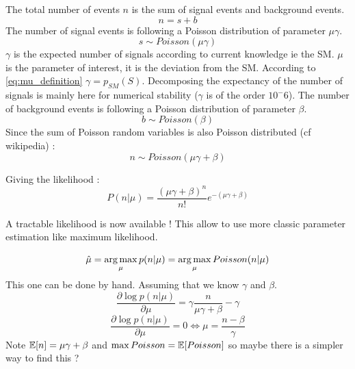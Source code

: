 

The total number of events $n$ is the sum of signal events and background events.
\begin{equation}
	n = s + b
\end{equation}
The number of signal events is following a Poisson distribution of parameter $\mu \gamma$.
\begin{equation}
	s \sim Poisson(\mu \gamma)
\end{equation}
$\gamma$ is the expected number of signals according to current knowledge ie the SM.
$\mu$ is the parameter of interest, it is the deviation from the SM.
According to \autoref{eq:mu_definition} $\gamma = p_{SM}(S)$.
Decomposing the expectancy of the number of signals is mainly here for numerical stability ($\gamma$ is of the order $10^-6$\needcite).
The number of background events is following a Poisson distribution of parameter $\beta$.
\begin{equation}
	b \sim Poisson(\beta)
\end{equation}
Since the sum of Poisson random variables is also Poisson distributed \needcite (cf wikipedia) :
\begin{equation}
	n \sim Poisson(\mu \gamma + \beta)
\end{equation}

Giving the likelihood :
\begin{equation}
	P(n| \mu) = \frac{(\mu \gamma +\beta)^n }{n!} e^{-(\mu \gamma +\beta)}
\end{equation}

A tractable likelihood is now available !
This allow to use more classic parameter estimation like maximum likelihood.

\begin{equation}
    \hat \mu = \operatorname*{arg\,max}_\mu p(n|\mu) =  \operatorname*{arg\,max}_\mu Poisson(n|\mu)
\end{equation}
This one can be done by hand. Assuming that we know $\gamma$ and  $\beta$.
\begin{equation}
    \frac{\partial \log p(n|\mu)}{\partial \mu} =  \gamma \frac{n}{\mu\gamma + \beta} - \gamma
\end{equation}
\begin{equation}
    \frac{\partial \log p(n|\mu)}{\partial \mu} = 0 \iff \mu = \frac{n-\beta}{\gamma}
\end{equation}
Note $\mathbb{E}[n] = \mu\gamma + \beta$ and $\max Poisson = \mathbb{E}[Poisson]$ so maybe there is a simpler way to find this ?






